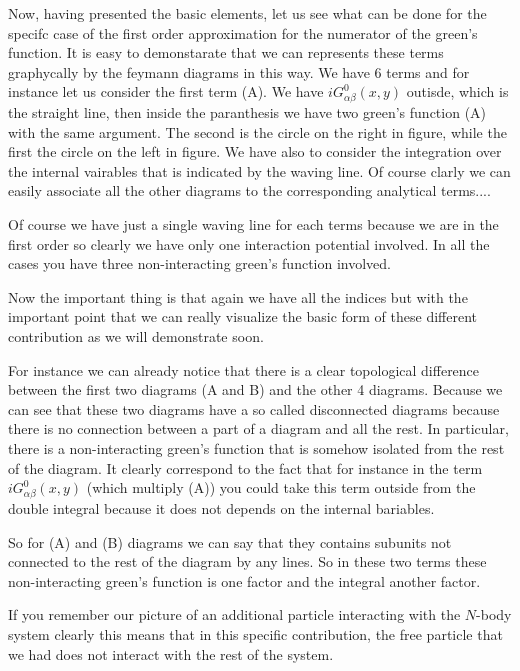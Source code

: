 \documentclass[../main/main.tex]{subfiles}
\begin{document}
Now, having presented the basic elements, let us see what can be done for the specifc case of the first order approximation for the numerator of the green's function.
It is easy to demonstarate that we can represents these terms graphycally by the feymann diagrams in this way.
We have 6 terms and for instance let us consider the first term (A). We have \( i G^0 _{\alpha \beta } (x,y) \) outisde, which is the straight line, then inside the paranthesis we have two green's function (A) with the same argument. The second is the circle on the right in figure, while the first the circle on the left in figure.
We have also to consider the integration over the internal vairables that is indicated by the waving line.
Of course clarly we can easily associate all the other diagrams to the corresponding analytical terms....

Of course we have just a single waving line for each terms because we are in the first order so clearly we have only one interaction potential involved. In all the cases you have three non-interacting green's function involved.

Now the important thing is that again we have all the indices but with the important point that we can really visualize the basic form of these different contribution as we will demonstrate soon.

For instance we can already notice that there is a clear topological difference between the first two diagrams (A and B) and the other 4 diagrams. Because we can see that these two diagrams have a so called disconnected diagrams because there is no connection between a part of a diagram and all the rest. In particular, there is a non-interacting green's function that is somehow isolated from the rest of the diagram. It clearly correspond to the fact that for instance in the term \( i G^0_{\alpha \beta } (x,y) \) (which multiply (A)) you could take this term outside from the double integral because it does not depends on the internal bariables.

So for (A) and (B) diagrams we can say that they contains subunits not connected to the rest of the diagram by any lines. So in these two terms these non-interacting green's function is one factor and the integral another factor.

If you remember our picture of an additional particle interacting with the \( N \)-body system clearly this means that in this specific contribution, the free particle that we had does not interact with the rest of the system.
\end{document}

